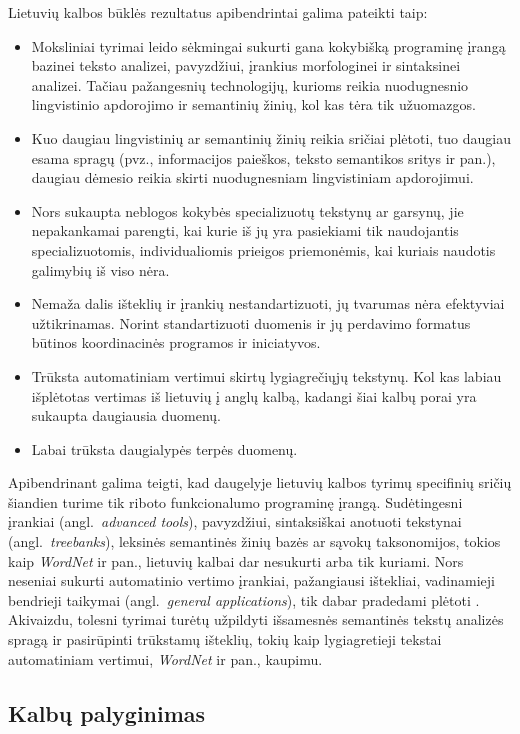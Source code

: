 \begin{multicols}{2}
Lietuvių kalbos būklės rezultatus apibendrintai galima pateikti taip:

\begin{itemize}
\item Moksliniai tyrimai leido sėkmingai sukurti gana kokybišką programinę įrangą bazinei teksto analizei, pavyzdžiui, įrankius morfologinei ir sintaksinei analizei. Tačiau pažangesnių technologijų, kurioms reikia nuodugnesnio lingvistinio apdorojimo ir semantinių žinių, kol kas tėra tik užuomazgos.
\item Kuo daugiau lingvistinių ar semantinių žinių reikia sričiai plėtoti, tuo daugiau esama spragų (pvz., informacijos paieškos, teksto semantikos sritys ir pan.), daugiau dėmesio reikia skirti nuodugnesniam lingvistiniam apdorojimui.
\item Nors sukaupta neblogos kokybės specializuotų tekstynų ar garsynų, jie nepakankamai parengti, kai kurie iš jų yra pasiekiami tik naudojantis specializuotomis, individualiomis prieigos priemonėmis, kai kuriais naudotis galimybių iš viso nėra. 
\item  Nemaža dalis išteklių ir įrankių nestandartizuoti, jų tvarumas nėra efektyviai užtikrinamas. Norint standartizuoti duomenis ir jų perdavimo formatus būtinos koordinacinės programos ir iniciatyvos.
\item Trūksta automatiniam vertimui skirtų lygiagrečiųjų tekstynų. Kol kas labiau išplėtotas vertimas iš lietuvių į anglų kalbą, kadangi šiai kalbų porai yra sukaupta daugiausia duomenų.
\item Labai trūksta daugialypės terpės duomenų.	
\end{itemize}

Apibendrinant galima teigti, kad daugelyje lietuvių kalbos tyrimų specifinių sričių šiandien turime tik riboto funkcionalumo programinę įrangą. Sudėtingesni įrankiai (angl.~\textit{advanced tools}), pavyzdžiui, sintaksiškai anotuoti tekstynai (angl.~\textit{treebanks}), leksinės semantinės žinių bazės ar sąvokų taksonomijos, tokios kaip \textit{WordNet} ir pan., lietuvių kalbai dar nesukurti arba tik kuriami. Nors neseniai sukurti automatinio vertimo įrankiai, pažangiausi ištekliai, vadinamieji bendrieji taikymai (angl.~\textit{general applications}), tik dabar pradedami plėtoti \cite{td1}. Akivaizdu, tolesni tyrimai turėtų užpildyti išsamesnės semantinės tekstų analizės spragą ir pasirūpinti trūkstamų išteklių, tokių kaip lygiagretieji tekstai automatiniam vertimui, \textit{WordNet} ir pan., kaupimu.

\subsection{Kalbų palyginimas}


\end{multicols}
